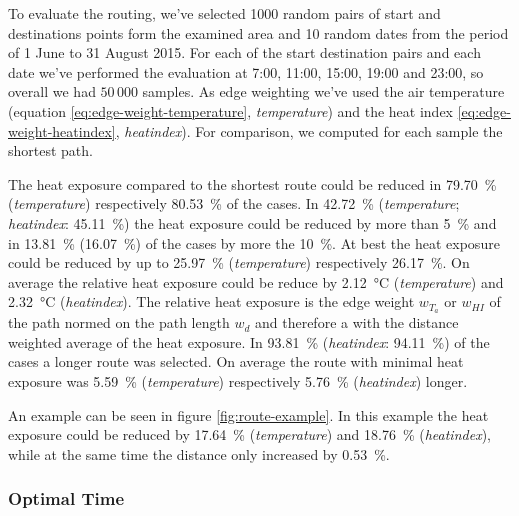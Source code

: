 To evaluate the routing, we've selected 1000 random pairs of start and destinations points form the examined  area and 10 random dates from the period of 1 June to 31 August 2015. For each of the start destination pairs and each date we've performed the evaluation at 7:00, 11:00, 15:00, 19:00 and 23:00, so overall we had $50\,000$ samples. As edge weighting we've used the air temperature (equation \eqref{eq:edge-weight-temperature}, \emph{temperature})  and the heat index \eqref{eq:edge-weight-heatindex}, \emph{heatindex}). For comparison, we computed for each sample the shortest path. 


The heat exposure compared to the shortest route could be reduced in \SI{79.70}{\percent} (\emph{temperature}) respectively  \SI{80.53}{\percent} of the cases. In \SI{42.72}{\percent} (\emph{temperature}; \emph{heatindex}: \SI{45.11}{\percent}) the heat exposure could be reduced by more than \SI{5}{\percent} and in \SI{13.81}{\percent} (\SI{16.07}{\percent}) of the cases by more the \SI{10}{\percent}. At best the heat exposure could be reduced by up to \SI{25.97}{\percent} (\emph{temperature}) respectively  \SI{26.17 }{\percent}. On average the relative heat exposure could be reduce by \SI{2.12}{\celsius} (\emph{temperature}) and \SI{ 2.32}{\celsius} (\emph{heatindex}). The relative heat exposure is the edge weight $w_{T_a}$ or $w_{HI}$ of the path normed on the path length $w_d$ and therefore a with the distance weighted average of the heat exposure. In \SI{93.81}{\percent} (\emph{heatindex}: \SI{94.11}{\percent}) of the cases a longer route was selected. On average the route with minimal heat exposure was \SI{5.59}{\percent} (\emph{temperature}) respectively  \SI{5.76}{\percent} (\emph{heatindex}) longer. 

An example can be seen in figure \ref{fig:route-example}. In this example the heat exposure could be reduced by \SI{17.64}{\percent} (\emph{temperature}) and \SI{18.76}{\percent} (\emph{heatindex}), while at the same time the distance only increased by  \SI{0.53}{\percent}.

\subsubsection{Optimal Time}

